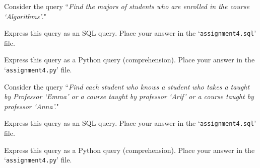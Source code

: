 \documentclass[12pt]{exam}
\newcommand{\<}{\langle}
\renewcommand{\>}{\rangle}
\theoremstyle{definition}   %
\begin{document}
\begin{questions}





\question
Consider the query ``\emph{Find the majors of students who are enrolled in the course `Algorithms'}."
\begin{parts}
\item  Express this query as an SQL query.   Place your answer in the `{\tt assignment4.sql}' file.
\item  Express this query as a Python query (comprehension).   Place your answer in the `{\tt assignment4.py}' file.
\end{parts}

\question
Consider the query ``\emph{Find each student who knows a student who takes a taught by Professor `Emma' or a course taught by professor `Arif' or a
course taught by professor `Anna'.}"

\begin{parts}
\item  Express this query as an SQL query.   Place your answer in the `{\tt assignment4.sql}' file.
\item  Express this query as a Python query (comprehension).   Place your answer in the `{\tt assignment4.py}' file.
\end{parts}


\end{questions}
\end{document}
